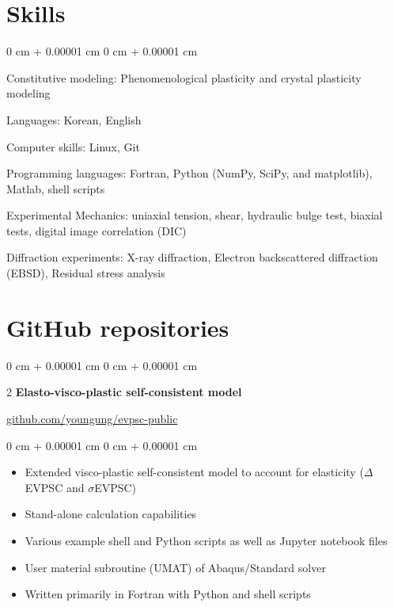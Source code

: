 \documentclass[10pt, letterpaper]{article}
\newenvironment{highlights}{
    \begin{itemize}[
        topsep=0.10 cm,
        parsep=0.10 cm,
        partopsep=0pt,
        itemsep=0pt,
        leftmargin=0 cm + 10pt
    ]
}{
    \end{itemize}
} %
\newenvironment{onecolentry}{
    \begin{adjustwidth}{
        0 cm + 0.00001 cm
    }{
        0 cm + 0.00001 cm
    }
}{
    \end{adjustwidth}
} %
\newenvironment{twocolentry}[2][]{
    \onecolentry
    \def\secondColumn{#2}
    \setcolumnwidth{\fill, 4.5 cm}
    \begin{paracol}{2}
}{
    \switchcolumn \raggedleft \secondColumn
    \end{paracol}
    \endonecolentry
} %
\begin{document}
    \section{Skills}
        \begin{onecolentry}
            \item Constitutive modeling: Phenomenological plasticity and crystal plasticity modeling
            \item Languages: Korean, English
            \item Computer skills: Linux, Git
            \item Programming languages: Fortran, Python (NumPy, SciPy, and matplotlib), Matlab, shell scripts
            \item Experimental Mechanics: uniaxial tension, shear, hydraulic bulge test, biaxial tests, digital image correlation (DIC)
            \item Diffraction experiments: X-ray diffraction, Electron backscattered diffraction (EBSD), Residual stress analysis
        \end{onecolentry}

    \section{GitHub repositories}
        \begin{twocolentry}{\href{https://github.com/youngung/evpsc-public}{github.com/youngung/evpsc-public}}\textbf{Elasto-visco-plastic self-consistent model}
        \end{twocolentry}
        \vspace{0.10 cm}
        \begin{onecolentry}
            \begin{highlights}
                \item Extended visco-plastic self-consistent model to account for elasticity ($\Delta$EVPSC and $\sigma$EVPSC)
                \item Stand-alone calculation capabilities
                \item Various example shell and Python scripts as well as Jupyter notebook files
                \item User material subroutine (UMAT) of Abaqus/Standard solver
                \item Written primarily in Fortran with Python and shell scripts
            \end{highlights}
        \end{onecolentry}
        \vspace{0.4 cm}
\end{document}
